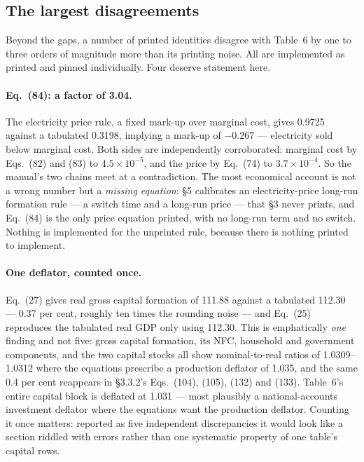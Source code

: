 \subsection{The largest disagreements}

Beyond the gaps, a number of printed identities disagree with Table~6 by one to three orders of magnitude more than its printing noise. All are implemented as printed and pinned individually. Four deserve statement here.

\paragraph{Eq.~(84): a factor of 3.04.} The electricity price rule, a fixed mark-up over marginal cost, gives 0.9725 against a tabulated 0.3198, implying a mark-up of $-0.267$ --- electricity sold below marginal cost. Both sides are independently corroborated: marginal cost by Eqs.~(82) and (83) to $4.5\times10^{-5}$, and the price by Eq.~(74) to $3.7\times10^{-4}$. So the manual's two chains meet at a contradiction. The most economical account is not a wrong number but a \emph{missing equation}: \S5 calibrates an electricity-price long-run formation rule --- a switch time and a long-run price --- that \S3 never prints, and Eq.~(84) is the only price equation printed, with no long-run term and no switch. Nothing is implemented for the unprinted rule, because there is nothing printed to implement.

\paragraph{One deflator, counted once.} Eq.~(27) gives real gross capital formation of 111.88 against a tabulated 112.30 --- 0.37 per cent, roughly ten times the rounding noise --- and Eq.~(25) reproduces the tabulated real GDP only using 112.30. This is emphatically \emph{one} finding and not five: gross capital formation, its NFC, household and government components, and the two capital stocks all show nominal-to-real ratios of 1.0309--1.0312 where the equations prescribe a production deflator of 1.035, and the same 0.4 per cent reappears in \S3.3.2's Eqs.~(104), (105), (132) and (133). Table~6's entire capital block is deflated at 1.031 --- most plausibly a national-accounts investment deflator where the equations want the production deflator. Counting it once matters: reported as five independent discrepancies it would look like a section riddled with errors rather than one systematic property of one table's capital rows.

